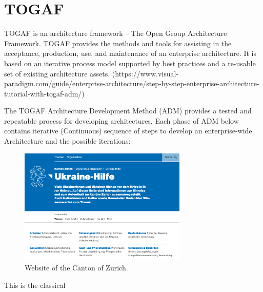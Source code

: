 \section{TOGAF}
TOGAF is an architecture framework – The Open Group Architecture Framework. TOGAF provides the methods and tools for assisting in the acceptance, production, use, and maintenance of an enterprise architecture. It is based on an iterative process model supported by best practices and a re-usable set of existing architecture assets. (https://www.visual-paradigm.com/guide/enterprise-architecture/step-by-step-enterprise-architecture-tutorial-with-togaf-adm/)

The TOGAF Architecture Development Method (ADM) provides a tested and repeatable process for developing architectures. Each phase of ADM below contains iterative (Continuous) sequence of steps to develop an enterprise-wide Architecture and the possible iterations:
\begin{figure}[tbp]
\centering
\includegraphics[width=8cm]{Figures/Ukraine_Hilfe.jpg}
\caption{Website of the Canton of Zurich.}
\label{fig:1}
\end{figure}

This is the classical 


